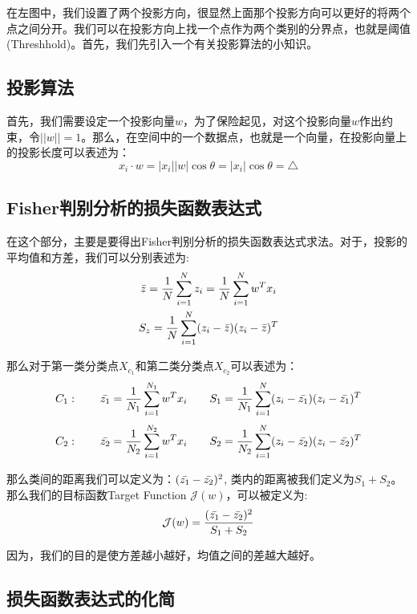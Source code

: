\documentclass[a4paper]{article}
\begin{document}
在左图中，我们设置了两个投影方向，很显然上面那个投影方向可以更好的将两个点之间分开。我们可以在投影方向上找一个点作为两个类别的分界点，也就是阈值(Threshhold)。首先，我们先引入一个有关投影算法的小知识。

\subsection{投影算法}
首先，我们需要设定一个投影向量$w$，为了保险起见，对这个投影向量$w$作出约束，令$||w||=1$。那么，在空间中的一个数据点，也就是一个向量，在投影向量上的投影长度可以表述为：
\begin{equation}
    x_i\cdot w = |x_i||w|\cos{\theta}=|x_i|\cos{\theta}=\triangle
\end{equation}

\subsection{Fisher判别分析的损失函数表达式}
在这个部分，主要是要得出Fisher判别分析的损失函数表达式求法。对于，投影的平均值和方差，我们可以分别表述为:
\begin{gather}
    \Bar{z}=\frac{1}{N}\sum_{i=1}^{N}z_i = \frac{1}{N}\sum_{i=1}^{N}w^Tx_i \\
    S_z=\frac{1}{N}\sum_{i=1}^N(z_i-\Bar{z})(z_i-\Bar{z})^T
\end{gather}

那么对于第一类分类点$X_{c_1}$和第二类分类点$X_{c_2}$可以表述为：
\begin{equation}
    C_1:\qquad \Bar{z_1}= \frac{1}{N_1}\sum_{i=1}^{N_1}w^Tx_i \qquad S_1 =\frac{1}{N_1}\sum_{i=1}^N(z_i-\Bar{z_1})(z_i-\Bar{z_1})^T
\end{equation}
\begin{equation}
    C_2:\qquad \Bar{z_2}= \frac{1}{N_2}\sum_{i=1}^{N_2}w^Tx_i \qquad S_2 =\frac{1}{N_2}\sum_{i=1}^N(z_i-\Bar{z_2})(z_i-\Bar{z_2})^T
\end{equation}

那么类间的距离我们可以定义为：$(\Bar{z_1}-\Bar{z_2})^2$,
类内的距离被我们定义为$S_1+S_2$。那么我们的目标函数Target Function $\mathcal{J}(w)$，可以被定义为:
\begin{equation}
    \mathcal{J}(w) = \frac{(\Bar{z_1}-\Bar{z_2})^2}{S_1+S_2}
\end{equation}

因为，我们的目的是使方差越小越好，均值之间的差越大越好。

\subsection{损失函数表达式的化简}
\end{document}
